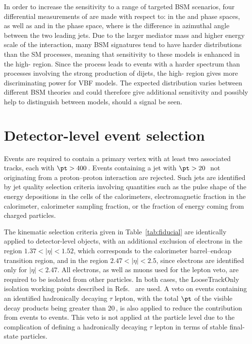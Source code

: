 \documentclass[cernpreprint,txfonts,UKenglish,texlive=2016]{\ATLASLATEXPATH atlasdoc}
\begin{document}
In order to increase the sensitivity to a range of targeted BSM
scenarios, four differential measurements of \Rmiss{} are made with respect to: 
\ptmiss{} in the \onejet{}  and \vbf{} phase spaces, as well as \mjj{} and \dphijj{}
in the \vbf{} phase space, 
where \dphijj{} is the difference in
azimuthal angle between the two leading jets.
Due to the larger mediator mass and higher energy scale of the interaction, many BSM signatures tend
to have harder \ptmiss{} distributions than the SM processes, meaning
that sensitivity to these models is enhanced in the high-\ptmiss{} region. 
Since the \vbf{} process leads to events with
a harder \mjj{} spectrum than processes involving the strong production
of dijets, the high-\mjj{} region gives more discriminating power for
VBF models. The expected \dphijj{} distribution  varies between different
BSM theories and could therefore give additional sensitivity and
possibly help to distinguish between models, should a signal be seen.



\section{Detector-level event selection}
\label{sec:reco}
Events are required to contain a primary vertex
with at least two associated tracks, each with $\pt > 400$\,\MeV.
Events containing a jet with $\pt > 20$\,\GeV\ not originating from a proton--proton
interaction are rejected. Such jets are identified by jet quality selection criteria involving quantities such as the
pulse shape of the energy depositions in the cells of the calorimeters, electromagnetic fraction in
the calorimeter, calorimeter sampling fraction, or the fraction of
energy coming from charged particles.

The kinematic selection criteria given in Table~\ref{tab:fiducial}
are identically applied to detector-level objects, with an additional
exclusion of electrons in the region $1.37 < |\eta| < 1.52$, which corresponds to the
calorimeter barrel--endcap transition region, and in the region  $2.47
< |\eta| < 2.5$, since electrons are identified only for $|\eta| <2.47$.
All electrons, as well as muons used for the lepton veto, are required to be
isolated from other particles. In both cases, the LooseTrackOnly
isolation working points described in Refs.~\cite{PERF-2015-10,PERF-2016-01} are used.
A veto on events
containing an identified hadronically decaying $\tau$ lepton, with the
total $\pt$ of the visible decay products being greater than 20\,\GeV,
is also applied to reduce the contribution from \Wtaunu{}
events to \ptmissjet{} events. This veto is not applied at the
particle level due to the complication of defining a hadronically
decaying $\tau$ lepton in terms of stable final-state particles.
\end{document}
